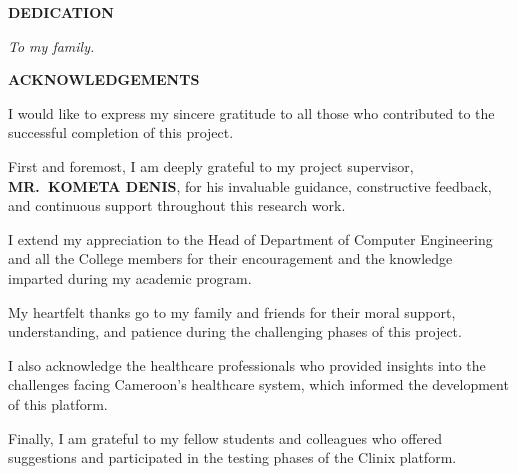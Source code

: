 \clearpage

\begin{center}
{\Large\bfseries DEDICATION}
\end{center}
\vspace{2.0cm}

\begin{center}
\textit{To my family.}
\end{center}

\clearpage

\begin{center}
{\Large\bfseries ACKNOWLEDGEMENTS}
\end{center}
\vspace{0.8cm}

I would like to express my sincere gratitude to all those who contributed to the successful completion of this project.

\vspace{0.4cm}
First and foremost, I am deeply grateful to my project supervisor, \textbf{MR.\ KOMETA DENIS}, for his invaluable guidance, constructive feedback, and continuous support throughout this research work.

\vspace{0.4cm}
I extend my appreciation to the Head of Department of Computer Engineering and all the College members for their encouragement and the knowledge imparted during my academic program.

\vspace{0.4cm}
My heartfelt thanks go to my family and friends for their moral support, understanding, and patience during the challenging phases of this project.

\vspace{0.4cm}
I also acknowledge the healthcare professionals who provided insights into the challenges facing Cameroon's healthcare system, which informed the development of this platform.

\vspace{0.4cm}
Finally, I am grateful to my fellow students and colleagues who offered suggestions and participated in the testing phases of the Clinix platform.

\clearpage
